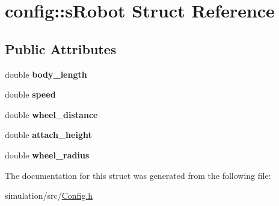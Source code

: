 \hypertarget{structconfig_1_1s_robot}{}\section{config\+:\+:s\+Robot Struct Reference}
\label{structconfig_1_1s_robot}
\subsection*{Public Attributes}
\begin{DoxyCompactItemize}
\item 
\mbox{\label{structconfig_1_1s_robot_a825d14248f65e3eeeb159c2cb54ab3cb}} 
double {\bfseries body\+\_\+length}
\item 
\mbox{\label{structconfig_1_1s_robot_ab3ed79becfa66c518fcef7583b8a5179}} 
double {\bfseries speed}
\item 
\mbox{\label{structconfig_1_1s_robot_a4a22c395cc9d20e8c3e424129bb5ccc6}} 
double {\bfseries wheel\+\_\+distance}
\item 
\mbox{\label{structconfig_1_1s_robot_a2b7da73a6f21f32ee3ab0262e804f889}} 
double {\bfseries attach\+\_\+height}
\item 
\mbox{\label{structconfig_1_1s_robot_a097bf4c624355c380b64216da30514ec}} 
double {\bfseries wheel\+\_\+radius}
\end{DoxyCompactItemize}


The documentation for this struct was generated from the following file\+:\begin{DoxyCompactItemize}
\item 
simulation/src/\mbox{\hyperlink{_config_8h}{Config.\+h}}\end{DoxyCompactItemize}
